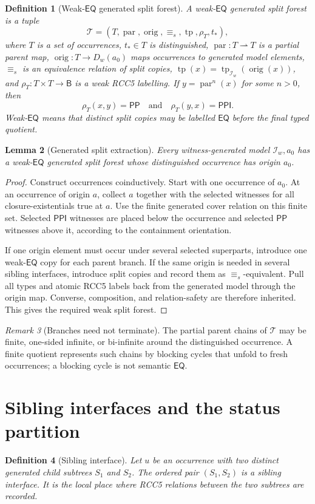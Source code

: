 \documentclass[11pt]{article}
\newtheorem{definition}{Definition}[section]
\newtheorem{lemma}[definition]{Lemma}
\theoremstyle{remark}
\newtheorem{remark}[definition]{Remark}
\newcommand{\Base}{\mathsf{B}}
\newcommand{\PP}{\mathsf{PP}}
\newcommand{\PPI}{\mathsf{PPI}}
\newcommand{\EQ}{\mathsf{EQ}}
\newcommand{\tp}{\operatorname{tp}}
\newcommand{\orig}{\operatorname{orig}}
\newcommand{\parr}{\operatorname{par}}
\newcommand{\I}{\mathcal{I}}
\newcommand{\T}{\mathcal{T}}
\newcommand{\same}{\mathrel{\equiv_s}}
\begin{document}
\begin{definition}[Weak-$\EQ$ generated split forest]\label{def:split-forest}
A weak-$\EQ$ generated split forest is a tuple
\[
\T=(T,\parr,\orig,\same,\tp,\rho_T,t_*),
\]
where $T$ is a set of occurrences, $t_*\in T$ is distinguished, $\parr:T\rightharpoonup T$ is a partial parent map, $\orig:T\to D_w(a_0)$ maps occurrences to generated model elements, $\same$ is an equivalence relation of split copies, $\tp(x)=\tp_{\I_w}(\orig(x))$, and $\rho_T:T\times T\to\Base$ is a weak RCC5 labelling.  If $y=\parr^n(x)$ for some $n>0$, then
\[
\rho_T(x,y)=\PP
\quad\text{and}\quad
\rho_T(y,x)=\PPI.
\]
Weak-$\EQ$ means that distinct split copies may be labelled $\EQ$ before the final typed quotient.
\end{definition}

\begin{lemma}[Generated split extraction]\label{lem:split-extraction}
Every witness-generated model $\I_w,a_0$ has a weak-$\EQ$ generated split forest whose distinguished occurrence has origin $a_0$.
\end{lemma}
\begin{proof}
Construct occurrences coinductively.  Start with one occurrence of $a_0$.  At an occurrence of origin $a$, collect $a$ together with the selected witnesses for all closure-existentials true at $a$.  Use the finite generated cover relation on this finite set.  Selected $\PPI$ witnesses are placed below the occurrence and selected $\PP$ witnesses above it, according to the containment orientation.

If one origin element must occur under several selected superparts, introduce one weak-$\EQ$ copy for each parent branch.  If the same origin is needed in several sibling interfaces, introduce split copies and record them as $\same$-equivalent.  Pull all types and atomic RCC5 labels back from the generated model through the origin map.  Converse, composition, and relation-safety are therefore inherited.  This gives the required weak split forest.
\end{proof}

\begin{remark}[Branches need not terminate]
The partial parent chains of $\T$ may be finite, one-sided infinite, or bi-infinite around the distinguished occurrence.  A finite quotient represents such chains by blocking cycles that unfold to fresh occurrences; a blocking cycle is not semantic $\EQ$.
\end{remark}

\section{Sibling interfaces and the status partition}
\begin{definition}[Sibling interface]
Let $u$ be an occurrence with two distinct generated child subtrees $S_1$ and $S_2$.  The ordered pair $(S_1,S_2)$ is a sibling interface.  It is the local place where RCC5 relations between the two subtrees are recorded.
\end{definition}
\end{document}
